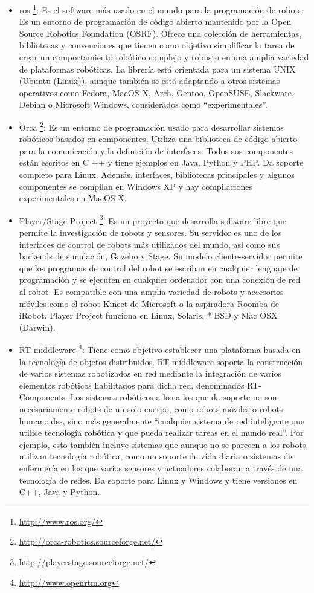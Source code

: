 \begin{itemize}
	\item \acrfull{ros} \footnote{\url{http://www.ros.org/}}: Es el software más usado en el mundo para la programación de robots. Es un entorno de programación de código abierto mantenido por la Open Source Robotics Foundation (OSRF). Ofrece una colección de herramientas, bibliotecas y convenciones que tienen como objetivo simplificar la tarea de crear un comportamiento robótico complejo y robusto en una amplia variedad de plataformas robóticas. La librería está orientada para un sistema UNIX (Ubuntu (Linux)), aunque también se está adaptando a otros sistemas operativos como Fedora, MacOS-X, Arch, Gentoo, OpenSUSE, Slackware, Debian o Microsoft Windows, considerados como ``experimentales''.
	
	\item Orca \footnote{\url{http://orca-robotics.sourceforge.net/}}: Es un entorno de programación usado para desarrollar sistemas robóticos basados en componentes. Utiliza una biblioteca de código abierto para la comunicación y la definición de interfaces. Todos sus componentes están escritos en C ++ y tiene ejemplos en Java, Python y PHP. Da soporte completo para Linux. Además, interfaces, bibliotecas principales y algunos componentes se compilan en Windows XP y hay compilaciones experimentales en MacOS-X.

	\item Player/Stage Project \footnote{\url{http://playerstage.sourceforge.net/}}: Es un proyecto que desarrolla software libre que permite la investigación de robots y sensores. Su servidor es uno de los interfaces de control de robots más utilizados del mundo, así como sus backends de simulación, Gazebo y Stage. Su modelo cliente-servidor permite que los programas de control del robot se escriban en cualquier lenguaje de programación y se ejecuten en cualquier ordenador con una conexión de red al robot. Es compatible con una amplia variedad de robots y accesorios móviles como el robot Kinect de Microsoft o la aspiradora Roomba de iRobot. Player Project funciona en Linux, Solaris, * BSD y Mac OSX (Darwin).

	\item RT-middleware \footnote{\url{http://www.openrtm.org}}: Tiene como objetivo establecer una plataforma basada en la tecnología de objetos distribuidos. RT-middleware soporta la construcción de varios sistemas robotizados en red mediante la integración de varios elementos robóticos habilitados para dicha red, denominados RT-Components. Los sistemas robóticos a los a los que da soporte no son necesariamente robots de un solo cuerpo, como robots móviles o robots humanoides, sino más generalmente ``cualquier sistema de red inteligente que utilice tecnología robótica y que pueda realizar tareas en el mundo real''. Por ejemplo, esto también incluye sistemas que aunque no se parecen a los robots utilizan tecnología robótica, como un soporte de vida diaria o sistemas de enfermería en los que varios sensores y actuadores colaboran a través de una tecnología de redes. Da soporte para Linux y Windows y tiene versiones en C++, Java y Python.


\end{itemize}
